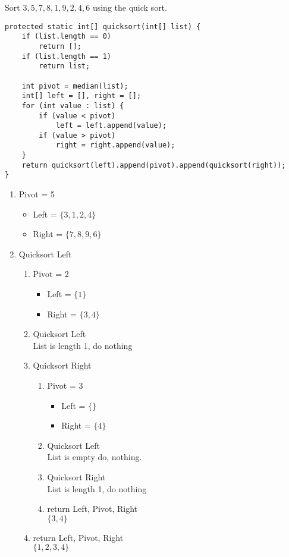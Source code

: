 \documentclass[12pt]{article}  %
\begin{document}
\noindent
Sort $3,5,7,8,1,9,2,4,6$ using the quick sort.\\
\begin{verbatim}
protected static int[] quicksort(int[] list) {
    if (list.length == 0)
        return [];
    if (list.length == 1)
        return list;
    
    int pivot = median(list);
    int[] left = [], right = [];
    for (int value : list) {
        if (value < pivot)
            left = left.append(value);
        if (value > pivot)
            right = right.append(value);
    }
    return quicksort(left).append(pivot).append(quicksort(right));
}
\end{verbatim}
\begin{enumerate}
    \item Pivot = 5
    \begin{itemize}
        \item Left = $\{3,1,2,4\}$
        \item Right = $\{7,8,9,6\}$
    \end{itemize}
    
    \item Quicksort Left
    \begin{enumerate}
        \item Pivot = 2
        \begin{itemize}
            \item Left = $\{1\}$
            \item Right = $\{3,4\}$
        \end{itemize}
        \item Quicksort Left\\
            List is length 1, do nothing
        \item Quicksort Right
        \begin{enumerate}
            \item Pivot = 3
            \begin{itemize}
                \item Left = $\{\}$
                \item Right = $\{4\}$
            \end{itemize}
            \item Quicksort Left\\
            List is empty do, nothing.
            \item Quicksort Right\\
            List is length 1, do nothing
            \item return Left, Pivot, Right\\
            $\{3,4\}$
        \end{enumerate}
        \item return Left, Pivot, Right\\
        $\{1,2,3,4\}$
    \end{enumerate}
    

\end{enumerate}
\end{document}
